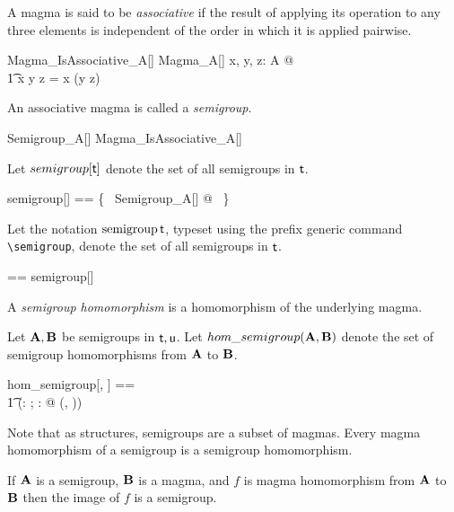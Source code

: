 \documentclass{amsart}
\begin{document}
A magma is said to be \textit{associative} if the result of applying its operation to any three elements
is independent of the order in which it is applied pairwise.

\begin{schema}{Magma\_IsAssociative\_A}[\genT]
	Magma\_A[\genT]
\where
	\forall x, y, z: A @ \\
	\t1	x \mulA y \mulA z = x \mulA (y \mulA z)
\end{schema}

An associative magma is called a \textit{semigroup}.
\begin{zed}
	Semigroup\_A[\genT]  Magma\_IsAssociative\_A[\genT]
\end{zed}

Let $semigroup[\mathsf{t}]$ denote the set of all semigroups in $\mathsf{t}$.

\begin{zed}
	semigroup[\genT] == \{~ Semigroup\_A[\genT] @ \strucA  ~\}
\end{zed}

Let the notation $\operatorname{semigroup} \mathsf{t}$, typeset using the prefix generic command \verb|\semigroup|,
denote the set of all semigroups in $\mathsf{t}$.

\begin{zed}
	\semigroup \genT == semigroup[\genT]
\end{zed}

\begin{remark}
\begin{zed}
	\semigroup \setT \subseteq \magma \setT
\end{zed}
\end{remark}

A \textit{semigroup homomorphism} is a homomorphism of the underlying magma.

Let $\mathbf{A}, \mathbf{B}$ be semigroups in $\mathsf{t}, \mathsf{u}$.
Let $hom\_semigroup(\mathbf{A}, \mathbf{B})$ denote the set of semigroup homomorphisms from $\mathbf{A}$ to $\mathbf{B}$.

\begin{zed}
	hom\_semigroup[\genT, \genU] == \\
	\t1	(\lambda \strucA: \semigroup \genT; \strucB: \semigroup \genU @ \homMagma(\strucA, \strucB))
\end{zed}

Note that as structures, semigroups are a subset of magmas.
Every magma homomorphism of a semigroup is a semigroup homomorphism.

If $\mathbf{A}$ is a semigroup, $\mathbf{B}$ is a magma, and $f$ is magma homomorphism from 
$\mathbf{A}$ to $\mathbf{B}$ then the image of $f$ is a semigroup.
\end{document}
